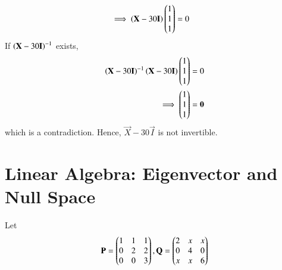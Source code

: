 \documentclass[journal,12pt,twocolumn]{IEEEtran}
\renewcommand\thesection{\arabic{section}}
\begin{document}
\begin{enumerate}[label=\thesection.\arabic*
,ref=\thesection.\theenumi]
\begin{align}
\implies \left(\mathbf{X}-30\mathbf{I}\right)\begin{pmatrix}1 \\1 \\1\end{pmatrix}  &=0
\end{align}
If $\left(\mathbf{X}-30\mathbf{I}\right)^{-1}$ exists,
\begin{align}
\left(\mathbf{X}-30\mathbf{I}\right)^{-1}\left(\mathbf{X}-30\mathbf{I}\right)\begin{pmatrix}1 \\1 \\1\end{pmatrix}  &=0
\nonumber \\
\implies \begin{pmatrix}1 \\1 \\1\end{pmatrix}  &=\mathbf{0}
\end{align}
%
which is a contradiction.  Hence, $\vec{X}-30\vec{I}$ is not invertible.
\end{enumerate}
\section{Linear Algebra: Eigenvector and Null Space}
Let 
\begin{align}
\mathbf{P} = \begin{pmatrix}1 & 1 & 1 \\ 0 & 2 & 2 \\ 0 & 0 & 3\end{pmatrix}, 
\mathbf{Q} = \begin{pmatrix}2 & x & x \\ 0 & 4 & 0 \\ x & x & 6\end{pmatrix}
\label{eq:2019_qp2_2_q}
\end{align}
%
\end{document}
